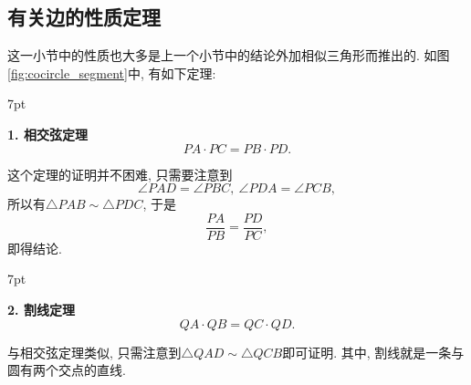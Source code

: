 \documentclass{book}
\newenvironment{theorem}{%
\def\FrameCommand{%
\hspace{1pt}%
{\color{cyan!60!blue}\vrule width 2pt}%
{\color{cyan!10}\vrule width 4pt}%
\colorbox{cyan!10}%
}%
\MakeFramed{\advance\hsize-\width\FrameRestore}%
\noindent\hspace{-4.55pt}%
\begin{adjustwidth}{}{7pt}%
\vspace{2pt}\vspace{2pt}%
}
{%
\vspace{2pt}\end{adjustwidth}\endMakeFramed%
}
\begin{document}
\begin{paracol}{2}
\subsection{有关边的性质定理}
这一小节中的性质也大多是上一个小节中的结论外加相似三角形而推出的. 如图\ref{fig:cocircle_segment}中, 有如下定理:
\begin{theorem}
	\textbf{1. 相交弦定理}
	\[PA\cdot PC=PB\cdot PD.\]
\end{theorem}
\par
这个定理的证明并不困难, 只需要注意到
\[\angle PAD=\angle PBC,\ \angle PDA=\angle PCB,\]
所以有$\triangle PAB\sim\triangle PDC$, 于是
\[\frac{PA}{PB}=\frac{PD}{PC},\]
即得结论.
\begin{theorem}
	\textbf{2. 割线定理}
	\[QA\cdot QB=QC\cdot QD.\]
\end{theorem}
\par
与相交弦定理类似, 只需注意到$\triangle QAD\sim\triangle QCB$即可证明. 其中, 割线就是一条与圆有两个交点的直线.\par 


\end{paracol}
\end{document}
